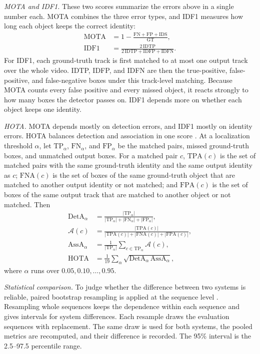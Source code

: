 \documentclass[pdflatex,sn-mathphys-num,iicol]{sn-jnl}
\begin{document}
\emph{MOTA and IDF1.} These two scores summarize the errors above in a
single number each. MOTA combines the three error types, and IDF1 measures
how long each object keeps the correct identity:
\begin{align}
\mathrm{MOTA}&=1-\frac{\mathrm{FN}+\mathrm{FP}+\mathrm{IDS}}{\mathrm{GT}},\label{eq:mota}\\
\mathrm{IDF1}&=\frac{2\,\mathrm{IDTP}}{2\,\mathrm{IDTP}+\mathrm{IDFP}+\mathrm{IDFN}}.\label{eq:idf1}
\end{align}
For IDF1, each ground-truth track is first matched to at most one output
track over the whole video. IDTP, IDFP, and IDFN are then the true-positive,
false-positive, and false-negative boxes under this track-level matching.
Because MOTA counts every false positive and every missed object, it reacts
strongly to how many boxes the detector passes on. IDF1 depends more on
whether each object keeps one identity.

\emph{HOTA.} MOTA depends mostly on detection errors, and IDF1 mostly on
identity errors. HOTA balances detection and association in one score
\cite{luiten2021hota}.
At a localization threshold $\alpha$, let $\mathrm{TP}_\alpha$,
$\mathrm{FN}_\alpha$, and $\mathrm{FP}_\alpha$ be the matched pairs, missed
ground-truth boxes, and unmatched output boxes. For a matched pair $c$,
$\mathrm{TPA}(c)$ is the set of matched pairs with the same ground-truth
identity and the same output identity as $c$; $\mathrm{FNA}(c)$ is the set of
boxes of the same ground-truth object that are matched to another output
identity or not matched; and $\mathrm{FPA}(c)$ is the set of boxes of the same
output track that are matched to another object or not matched. Then
\begin{align}
\mathrm{DetA}_\alpha&=\frac{|\mathrm{TP}_\alpha|}{|\mathrm{TP}_\alpha|+|\mathrm{FN}_\alpha|+|\mathrm{FP}_\alpha|},\label{eq:deta}\\
\mathcal{A}(c)&=\frac{|\mathrm{TPA}(c)|}{|\mathrm{TPA}(c)|+|\mathrm{FNA}(c)|+|\mathrm{FPA}(c)|},\label{eq:ac}\\
\mathrm{AssA}_\alpha&=\frac{1}{|\mathrm{TP}_\alpha|}\sum_{c\in\mathrm{TP}_\alpha}\mathcal{A}(c),\label{eq:assa}\\
\mathrm{HOTA}&=\frac{1}{19}\sum_{\alpha}\sqrt{\mathrm{DetA}_\alpha\,\mathrm{AssA}_\alpha},\label{eq:hota}
\end{align}
where $\alpha$ runs over $0.05, 0.10, \dots, 0.95$.

\emph{Statistical comparison.} To judge whether the difference between two
systems is reliable, paired bootstrap resampling is applied at the sequence
level \cite{efron1993bootstrap}. Resampling whole sequences keeps the
dependence within each sequence and gives intervals for system differences. Each resample draws the evaluation sequences with
replacement. The same draw is used for both systems, the pooled metrics are
recomputed, and their difference is recorded. The 95\% interval is the
2.5--97.5 percentile range.
\end{document}

